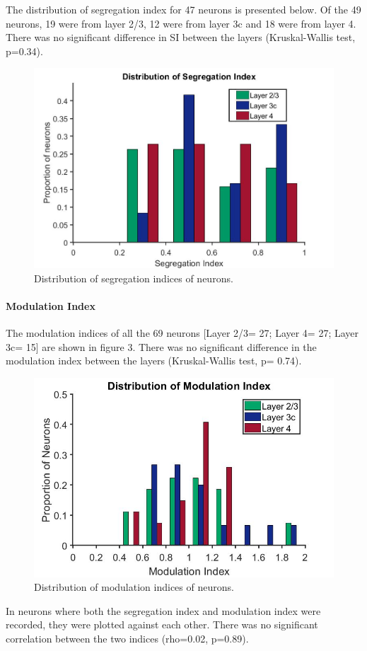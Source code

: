 	The distribution of segregation index for 47 neurons is presented below. Of the 49 neurons, 19 were from layer 2/3, 12 were from layer 3c and 18 were from layer 4. There was no significant difference in SI between the layers (Kruskal-Wallis test, p=0.34).
	\begin{figure}[H]
		
		\includegraphics[width=\linewidth]{LinearV1/segregationindex_colouradj.jpg}
		\caption{Distribution of segregation indices of neurons.}
		\label{fig:fig2}
	\end{figure}

	\paragraph{Modulation Index}
	The modulation indices of all the 69 neurons [Layer 2/3= 27; Layer 4= 27; Layer 3c= 15] are shown in figure 3. There was no significant difference in the modulation index between the layers (Kruskal-Wallis test, p= 0.74).
	
		\begin{figure}[H]
		
		\includegraphics[width=\linewidth]{LinearV1/modind_layer_colour.jpg}
		\caption{Distribution of modulation indices of neurons.}
		\label{fig:fig3}
	\end{figure}
	In neurons where both the segregation index and modulation index were recorded, they were plotted against each other. There was no significant correlation between the two indices (rho=0.02, p=0.89). 
	
